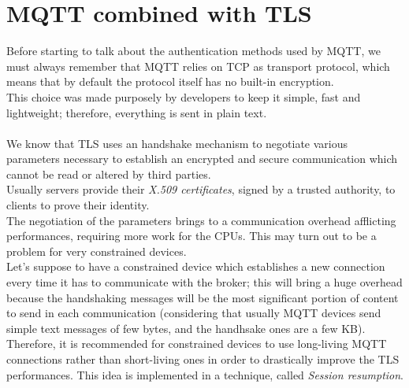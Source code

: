 \documentclass[12pt]{report}
\begin{document}
{{\section{MQTT combined with TLS}
\bigskip
Before starting to talk about the authentication methods used by MQTT, we must always remember that MQTT relies on TCP as transport protocol, which means that by default the protocol itself has no built-in encryption.\\
This choice was made purposely by developers to keep it simple, fast and lightweight; therefore, everything is sent in plain text.\\\\
We know that TLS uses an handshake mechanism to negotiate various parameters necessary to establish an encrypted and secure communication which cannot be read or altered by third parties.\\
Usually servers provide their \emph{X.509 certificates}, signed by a trusted authority, to clients to prove their identity.\\
The negotiation of the parameters brings to a communication overhead afflicting performances, requiring more work for the CPUs. This may turn out to be a problem for very constrained devices.\\
Let's suppose to have a constrained device which establishes a new connection every time it has to communicate with the broker; this will bring a huge overhead because the handshaking messages will be the most significant portion of content to send in each communication (considering that usually MQTT devices send simple text messages of few bytes, and the handhsake ones are a few KB).\\
Therefore, it is recommended for constrained devices to use long-living MQTT connections rather than short-living ones in order to drastically improve the TLS performances. This idea is implemented in a technique, called \emph{Session resumption}.

}}
\end{document}
